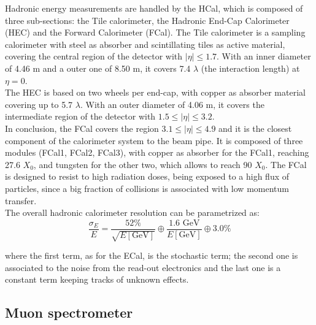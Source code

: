 Hadronic energy measurements are handled by the HCal, which is composed of three sub-sections: the Tile calorimeter, the Hadronic End-Cap Calorimeter (HEC) and the Forward Calorimeter (FCal).
The Tile calorimeter is a sampling calorimeter with steel as absorber and scintillating tiles as active material, covering the central region of the detector with $|\eta|\leq 1.7$. With an inner diameter of 4.46 m  and a outer one of 8.50 m, it covers 7.4 $\lambda$ (the interaction length) at $\eta = 0$.\\
The HEC is based on two wheels per end-cap, with copper as absorber material covering up to 5.7 $\lambda$. With an outer diameter of 4.06 m, it covers the intermediate region of the detector with $1.5 \leq |\eta| \leq 3.2$.\\
In conclusion, the FCal covers the region $3.1 \leq |\eta| \leq 4.9$ and it is the closest component of the calorimeter system to the beam pipe. It is composed of three modules (FCal1, FCal2, FCal3), with copper as absorber for the FCal1, reaching 27.6 $X_0$, and tungsten for the other two, which allows to reach 90 $X_0$.
The FCal is designed to resist to high radiation doses, being exposed to a high flux of particles, since a big fraction of collisions is associated with low momentum transfer.\\
The overall hadronic calorimeter resolution can be parametrized as:
\begin{equation}\label{eq:LHCAtlas/ATLAS/Calo/ECal/HCal_resolution}
    \frac{\sigma_E}{E} = \frac{52\%}{\sqrt{E[\text{GeV}]}} \oplus \frac{1.6\text{ GeV}}{E[\text{GeV}]} \oplus 3.0\%
\end{equation}

\noindent where the first term, as for the ECal, is the stochastic term; the second one is associated to the noise from the read-out electronics and the last one is a constant term keeping tracks of unknown effects.\\

\subsection{Muon spectrometer}\label{sec:LHCAtlas/ATLAS/Muon}

